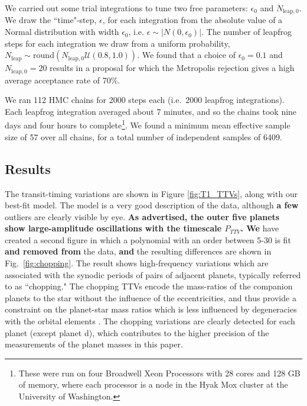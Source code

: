 \documentclass[twocolumn]{aastex63}
\begin{document}
We carried out some trial integrations to tune two free parameters:  $\epsilon_0$ and $N_{\mathrm{leap},0}$.  We draw the ``time"-step, $\epsilon$, for each integration from the absolute value of a Normal distribution with width $\epsilon_0$, i.e. $\epsilon \sim \vert N(0,\epsilon_0) \vert$.
The number of leapfrog steps for each integration we draw from a uniform probability,
$N_\mathrm{leap} \sim \mathrm{round}(N_{\mathrm{leap},0} \mathcal{U}(0.8,1.0))$.  We found that a choice of $\epsilon_0 = 0.1$
and $N_{\mathrm{leap},0} = 20$ results in a proposal for which the Metropolis rejection gives a high average acceptance rate of 70\%.

We ran 112 HMC chains for 2000 steps each (i.e.\ 2000 leapfrog integrations).   Each leapfrog integration averaged about 7 minutes, and so the chains took nine
days and four hours to complete\footnote{These were run on four Broadwell Xeon Processors with 28 cores and  128 GB of memory, where each processor is a node in the Hyak Mox cluster at the University of Washington.}.
We found a minimum mean effective sample size of 57 over all chains, for a
total number of independent samples of 6409.

\subsection{Results}

The transit-timing variations are shown in Figure \ref{fig:T1_TTVs}, along
with our best-fit model.  The model is a very good description of the data,
although \textbf{a few} outliers are clearly visible by eye.  \textbf{As
advertised, the outer five planets show large-amplitude oscillations with
the timescale $P_{TTV}$.  We} 
have created a second figure in which a polynomial with an order between 5-30 
is fit \textbf{and removed from} the data, \textbf{and} the resulting differences
are shown in Fig.\ \ref{fig:chopping}.  The result shows high-frequency variations which are
associated with the synodic periods of pairs of adjacent planets, typically
referred to as ``chopping."  The chopping TTVs encode the mass-ratios of
the companion planets to the star without the influence of the eccentricities,
and thus provide a constraint on the planet-star mass ratios which is less
influenced by degeneracies with the orbital elements \citep{Deck2015}.  The
chopping variations are clearly detected for each planet
(except planet d), which contributes to the higher
precision of the measurements of the planet
masses in this paper.
\end{document}
